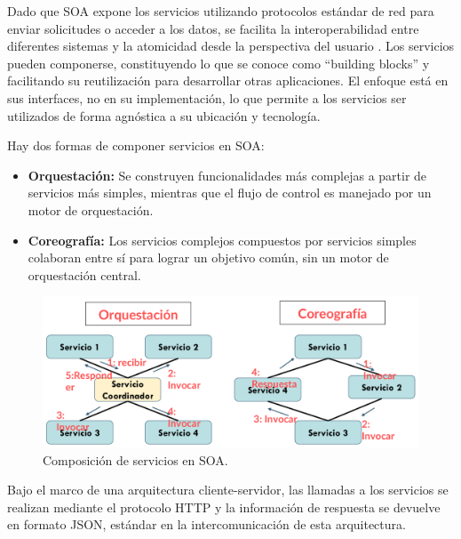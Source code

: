 Dado que SOA expone los servicios utilizando protocolos estándar de red para enviar solicitudes o acceder a los datos, se facilita la interoperabilidad entre diferentes sistemas y la atomicidad desde la perspectiva del usuario \cite{laskey2009service, 1210138}. Los servicios pueden componerse, constituyendo lo que se conoce como ``building blocks'' y facilitando su reutilización para desarrollar otras aplicaciones. El enfoque está en sus interfaces, no en su implementación, lo que permite a los servicios ser utilizados de forma agnóstica a su ubicación y tecnología.\newline

Hay dos formas de componer servicios en SOA:

\begin{itemize}
    \item \textbf{Orquestación:} Se construyen funcionalidades más complejas a partir de servicios más simples, mientras que el flujo de control es manejado por un motor de orquestación.
    \item \textbf{Coreografía:} Los servicios complejos compuestos por servicios simples colaboran entre sí para lograr un objetivo común, sin un motor de orquestación central.
\end{itemize}

\begin{figure}[H]
    \centering
    \includegraphics[width=1\textwidth]{./imagenes/Orquestacion_y_coreografia.png}
    \caption{Composición de servicios en SOA.}
\end{figure}

Bajo el marco de una arquitectura cliente-servidor, las llamadas a los servicios se realizan mediante el protocolo HTTP y la información de respuesta se devuelve en formato JSON, estándar en la intercomunicación de esta arquitectura.\newline

